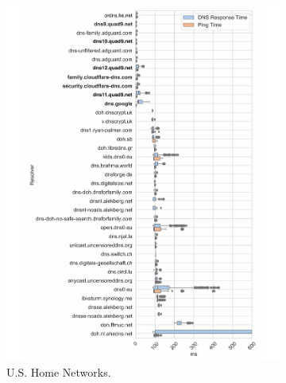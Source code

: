 \begin{figure}[h!]
\centering
%
\begin{subfigure}[b]{0.4\textwidth}
\includegraphics[width=\textwidth]{figures/poah_europe.pdf}
\caption{U.S. Home Networks.}
\end{subfigure}
%
\begin{subfigure}[b]{0.4\textwidth}

\end{subfigure}
\end{figure}
